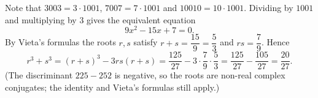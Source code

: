 Note that $3003=3\cdot1001$, $7007=7\cdot1001$ and $10010=10\cdot1001$. Dividing by $1001$ and multiplying by $3$ gives the equivalent equation
\[9x^2-15x+7=0 .\]
By Vieta's formulas the roots $r,s$ satisfy $r+s=\dfrac{15}{9}=\dfrac{5}{3}$ and $rs=\dfrac{7}{9}$. Hence
\[r^3+s^3=(r+s)^3-3rs(r+s)=\dfrac{125}{27}-3\cdot\dfrac{7}{9}\cdot\dfrac{5}{3}=\dfrac{125}{27}-\dfrac{105}{27}=\boxed{\dfrac{20}{27}}.\]
(The discriminant $225-252$ is negative, so the roots are non-real complex conjugates; the identity and Vieta's formulas still apply.)
